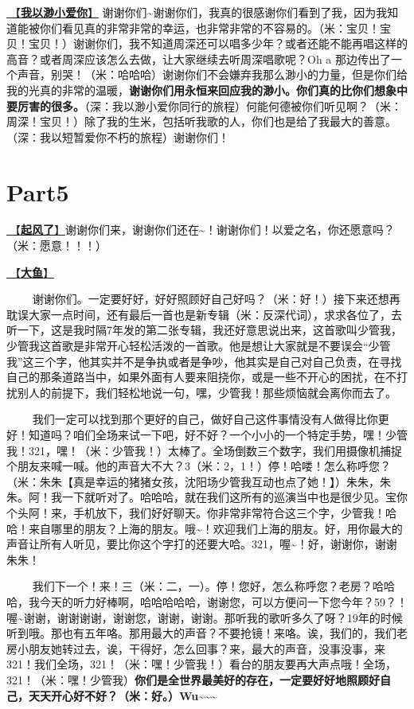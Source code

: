 \documentclass[]{ctexbook}
\begin{document}
\hyperref[loving-you-in-my-humble-way]{🎵【\textbf{我以渺小爱你}】} 谢谢你们\textasciitilde 谢谢你们，我真的很感谢你们看到了我，因为我知道能被你们看见真的非常非常的幸运，也非常非常的不容易的。（米：宝贝！宝贝！宝贝！）谢谢你们，我不知道周深还可以唱多少年？或者还能不能再唱这样的高音？或者周深应该怎么去做，让大家继续去听周深唱歌呢？Oh a 那边传出了一个声音，别哭！（米：哈哈哈）谢谢你们不会嫌弃我那么渺小的力量，但是你们给我的光真的非常的温暖，\textbf{谢谢你们用永恒来回应我的渺小。你们真的比你们想象中要厉害的很多。}（深：我以渺小爱你同行的旅程）何能何德被你们听见啊？（米：周深！宝贝！）除了我的生米，包括听我歌的人，你们也是给了我最大的善意。（深：我以短暂爱你不朽的旅程）谢谢你们！

\section{Part5}\label{suzhou-20241110-part5}

\hyperref[the-wind-rises]{🎵【\textbf{起风了}】}谢谢你们来，谢谢你们还在\textasciitilde！谢谢你们！以爱之名，你还愿意吗？（米：愿意！！！）

\hyperref[big-fish]{🎵【\textbf{大鱼}】}

   谢谢你们。一定要好好，好好照顾好自己好吗？（米：好！）接下来还想再耽误大家一点时间，还有最后一首也是新专辑（米：反深代词），求求各位了，去听一下，这是我时隔7年发的第二张专辑，我还好意思说出来，这首歌叫少管我，少管我这首歌是非常开心轻松活泼的一首歌。他是想让大家就是不要误会``少管我''这三个字，他其实并不是争执或者是争吵，他其实是自己对自己负责，在寻找自己的那条道路当中，如果外面有人要来阻挠你，或是一些不开心的困扰，在不打扰别人的前提下，我们轻松地说一句，嘿，少管我！那些烦恼就会离你而去了。

   我们一定可以找到那个更好的自己，做好自己这件事情没有人做得比你更好！知道吗？咱们全场来试一下吧，好不好？一个小小的一个特定手势，嘿！少管我！321，嘿！（米：少管我！）太棒了。全场倒数三个数字，我们用摄像机捕捉个朋友来喊一喊。他的声音大不大？3（米：2，1！）停！哈喽！怎么称呼您？（米：朱朱【真是幸运的猪猪女孩，沈阳场少管我互动也点了她！】）朱朱，朱朱。阿！我一下就听对了。哈哈哈，就在我们这所有的巡演当中也是很少见。宝你个头阿！来，手机放下，我们好好聊天。你非常非常符合这三个字，少管我！哈哈！来自哪里的朋友？上海的朋友。哦\textasciitilde！欢迎我们上海的朋友。好，用你最大的声音让所有人听见，要比你这个字打的还要大哈。321，喔\textasciitilde！好，谢谢你，谢谢朱朱！

   我们下一个！来！三（米：二，一）。停！您好，怎么称呼您？老房？哈哈哈，我今天的听力好棒啊，哈哈哈哈哈，谢谢您，可以方便问一下您今年？59？！喔\textasciitilde 谢谢，谢谢谢谢，谢谢您，谢谢，谢谢。那听我的歌听多久了呀？19年的时候听到哦。那也有五年咯。那用最大的声音？不要抢镜！来咯。诶，我们的，我们老房小朋友她转过去，诶，干得好，怎么回事？来，最大的声音，没事没事，来321！我们全场，321！（米：嘿！少管我！）看台的朋友要再大声点哦！全场，321！（米：嘿！少管我）\textbf{你们是全世界最美好的存在，一定要好好地照顾好自己，天天开心好不好？（米：好。）Wu\textasciitilde\textasciitilde\textasciitilde{}}
\end{document}
